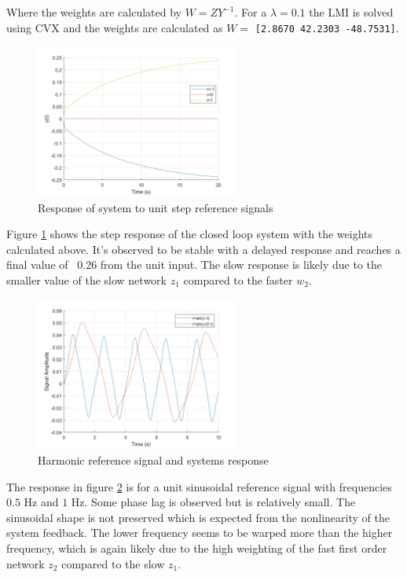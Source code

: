 \documentclass{article}
\begin{document}
Where the weights are calculated by $W = ZY^{-1}$.
For a $\lambda = 0.1$ the LMI is solved using CVX and the weights are calculated as $W =$ \texttt{[2.8670   42.2303  -48.7531]}.

\begin{figure}[H]
    \centering
    \includegraphics[width=0.6\textwidth]{figures/11_step_reference.png}
    \caption{Response of system to unit step reference signals}
    \label{fig:11_step}
\end{figure}

Figure \ref{fig:11_step} shows the step response of the closed loop system with the weights calculated above.
It's observed to be stable with a delayed response and reaches a final value of ~$0.26$ from the unit input.
The slow response is likely due to the smaller value of the slow network $z_1$ compared to the faster $w_2$.

\begin{figure}[H]
    \centering
    \includegraphics[width=0.6\textwidth]{figures/11_harmonic_reference.png}
    \caption{Harmonic reference signal and systems response}
    \label{fig:11_harmonic}
\end{figure}

The response in figure \ref{fig:11_harmonic} is for a unit sinusoidal reference signal with frequencies $0.5$ Hz and $1$ Hz.
Some phase lag is observed but is relatively small. The sinusoidal shape is not preserved which is expected from the nonlinearity of the system feedback.
The lower frequency seems to be warped more than the higher frequency, which is again likely due to the high weighting of the fast first order network $z_2$ compared to the slow $z_1$.
\end{document}
